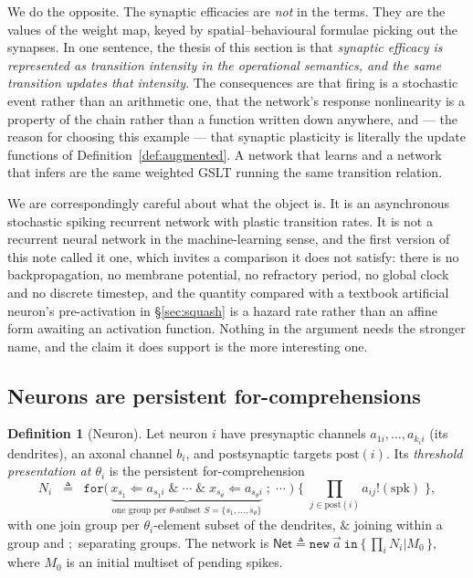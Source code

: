 \documentclass[11pt,a4paper]{article}
\theoremstyle{plain}
\theoremstyle{definition}
\newtheorem{definition}[theorem]{Definition}
\theoremstyle{remark}
\newcommand{\sepc}{\mathbin{\big|}}
\begin{document}
We do the opposite. The synaptic efficacies are \emph{not} in the terms. They are the values of the
weight map, keyed by spatial--behavioural formulae picking out the synapses. In one sentence, the
thesis of this section is that \emph{synaptic efficacy is represented as transition intensity in the
operational semantics, and the same transition updates that intensity}. The consequences are that
firing is a stochastic event rather than an arithmetic one, that the network's response nonlinearity
is a property of the chain rather than a function written down anywhere, and --- the reason for
choosing this example --- that synaptic plasticity is literally the update functions of
Definition~\ref{def:augmented}. A network that learns and a network that infers are the same weighted
GSLT running the same transition relation.

We are correspondingly careful about what the object is. It is an asynchronous stochastic spiking
recurrent network with plastic transition rates. It is not a recurrent neural network in the
machine-learning sense, and the first version of this note called it one, which invites a comparison
it does not satisfy: there is no backpropagation, no membrane potential, no refractory period, no
global clock and no discrete timestep, and the quantity compared with a textbook artificial neuron's
pre-activation in \S\ref{sec:squash} is a hazard rate rather than an affine form awaiting an
activation function. Nothing in the argument needs the stronger name, and the claim it does support
is the more interesting one.

\subsection{Neurons are persistent for-comprehensions}

\begin{definition}[Neuron]
\label{def:neuron}
Let neuron $i$ have presynaptic channels $a_{1i}, \ldots, a_{k_i i}$ (its dendrites), an axonal
channel $b_i$, and postsynaptic targets $\mathrm{post}(i)$. Its \emph{threshold presentation at
$\theta_i$} is the persistent for-comprehension
\[
N_i \;\;\triangleq\;\;
\texttt{for}\big(\,
\underbrace{x_{s_1} \Leftarrow a_{s_1 i} \;\&\; \cdots \;\&\; x_{s_{\theta}} \Leftarrow a_{s_\theta i}}_{\text{one group per }\theta\text{-subset } S = \{s_1,\ldots,s_\theta\}}
\;;\; \cdots \;\big)\;\big\{\;\textstyle\prod_{j \in \mathrm{post}(i)} a_{ij}!(\mathrm{spk})\;\big\},
\]
with one join group per $\theta_i$-element subset of the dendrites, $\&$ joining within a group and
$;$ separating groups. The network is
$\mathsf{Net} \triangleq \texttt{new}\ \vec{a}\ \texttt{in}\ \{\, \prod_i N_i \sepc M_0 \,\}$, where
$M_0$ is an initial multiset of pending spikes.
\end{definition}
\end{document}
